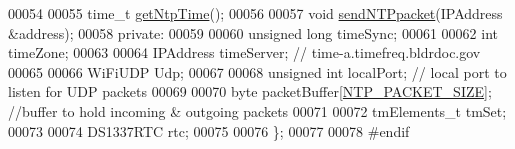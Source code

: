 \begin{DoxyCode}
00054 
00055     time\_t \hyperlink{class_cool_time_a41fbbbfd651c2079f54d4b2911e4c705}{getNtpTime}();
00056 
00057     \textcolor{keywordtype}{void} \hyperlink{class_cool_time_a236a38d120dc53bc67456d763838c5a1}{sendNTPpacket}(IPAddress &address);
00058 \textcolor{keyword}{private}:
00059     
00060     \textcolor{keywordtype}{unsigned} \textcolor{keywordtype}{long} timeSync;
00061     
00062     \textcolor{keywordtype}{int} timeZone;
00063     
00064     IPAddress timeServer; \textcolor{comment}{// time-a.timefreq.bldrdoc.gov}
00065     
00066     WiFiUDP Udp;
00067     
00068     \textcolor{keywordtype}{unsigned} \textcolor{keywordtype}{int} localPort;  \textcolor{comment}{// local port to listen for UDP packets}
00069 
00070     byte packetBuffer[\hyperlink{_cool_time_8h_a56a6ea64006651b4f42adf713e244f06}{NTP\_PACKET\_SIZE}]; \textcolor{comment}{//buffer to hold incoming & outgoing packets}
00071     
00072     tmElements\_t tmSet;
00073     
00074     DS1337RTC rtc;
00075 
00076 \};
00077 
00078 \textcolor{preprocessor}{#endif}
\end{DoxyCode}
